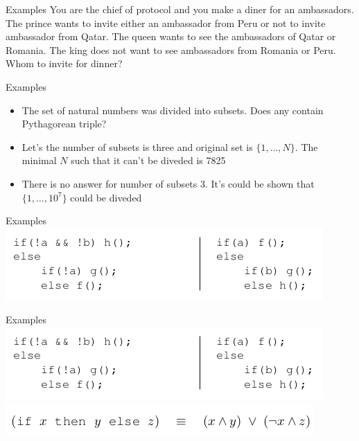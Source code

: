\documentclass[mathserif]{beamer}
\begin{document}
\begin{frame}{Examples}
You are the chief of protocol and you make a diner for an ambassadors. The prince wants to invite either an ambassador from Peru or not to invite ambassador from Qatar. The queen wants to see the ambassadors of Qatar or Romania. The king does not want to see ambassadors from Romania or Peru. Whom to invite for dinner?
\end{frame}

\begin{frame}{Examples}
\begin{itemize}
\item The set of natural numbers was divided into subsets. Does any contain Pythagorean triple?
\item Let's the number of subsets is three and original set is $\{1, \dots, N\}$. The minimal $N$ such that it can't be diveded is 7825
\item There is no answer for number of subsets 3. It's could be shown that $\{1, \dots, 10^7\}$ could be diveded
\end{itemize}
\end{frame}

\begin{frame}{Examples}
\includegraphics[scale=0.5]{equivalent1.png}
\end{frame}

\begin{frame}{Examples}
\includegraphics[scale=0.5]{equivalent1.png}
\includegraphics[scale=0.5]{equivalent2.png}
\end{frame}
\end{document}
